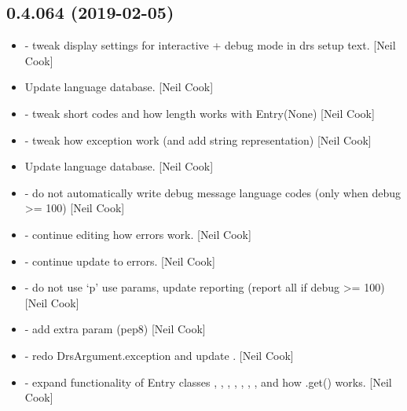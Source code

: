 \documentclass[a4paper,10pt,english]{report}
\begin{document}
\subsection{0.4.064 (2019-02-05)}
\label{\detokenize{misc/changelog:id195}}\begin{itemize}
\item {} 
 - tweak display settings for interactive + debug mode
in drs setup text. {[}Neil Cook{]}

\item {} 
Update language database. {[}Neil Cook{]}

\item {} 
 - tweak short codes and how length works with Entry(None)
{[}Neil Cook{]}

\item {} 
 - tweak how exception work (and add string
representation) {[}Neil Cook{]}

\item {} 
Update language database. {[}Neil Cook{]}

\item {} 
 - do not automatically write debug message language
codes (only when debug \textgreater{}= 100) {[}Neil Cook{]}

\item {} 
 - continue editing how errors work. {[}Neil Cook{]}

\item {} 
 - continue update to errors. {[}Neil Cook{]}

\item {} 
 - do not use ‘p’ use params, update reporting (report all
if debug \textgreater{}= 100) {[}Neil Cook{]}

\item {} 
 - add extra param (pep8) {[}Neil Cook{]}

\item {} 
 - redo DrsArgument.exception and update .
{[}Neil Cook{]}

\item {} 
 - expand functionality of Entry classes ,
, , , , , , 
and how .get() works. {[}Neil Cook{]}


\end{itemize}
\end{document}
